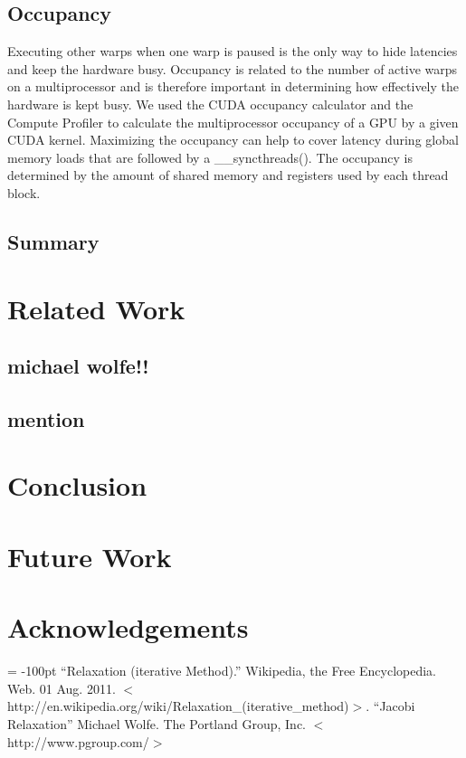 \documentclass[10pt]{article}
\begin{document}
\begin{multicols}{2}
    \subsection{Occupancy}
    Executing other warps when one warp is paused is the only way to hide latencies and keep the hardware busy.
    Occupancy is related to the number of active warps on a multiprocessor and is therefore important in determining how effectively the hardware is kept busy.
    We used the CUDA occupancy calculator and the Compute Profiler  to calculate the multiprocessor occupancy of a GPU by a given CUDA kernel.
    Maximizing the occupancy can help to cover latency during global memory loads that are followed by a \_\_syncthreads().
    The occupancy is determined by the amount of shared memory and registers used by each thread block.

\subsection{Summary} %

\section{Related Work} %
    \subsection{michael wolfe!!}
    \subsection{mention} %

\section{Conclusion} %

\section{Future Work} %
\section{Acknowledgements} %
\begin{flushleft}
\begin{thebibliography}{99}
\topmargin = -100pt
    ``Relaxation (iterative Method).''
        Wikipedia, the Free Encyclopedia. Web. 01 Aug. 2011. $<$http://en.wikipedia.org/wiki/Relaxation\_(iterative\_method)$>$.
    ``Jacobi Relaxation''
        Michael Wolfe. The Portland Group, Inc. $<$http://www.pgroup.com/$>$
\end{thebibliography}
\end{flushleft}

\clearpage

\end{multicols}
\end{document}
